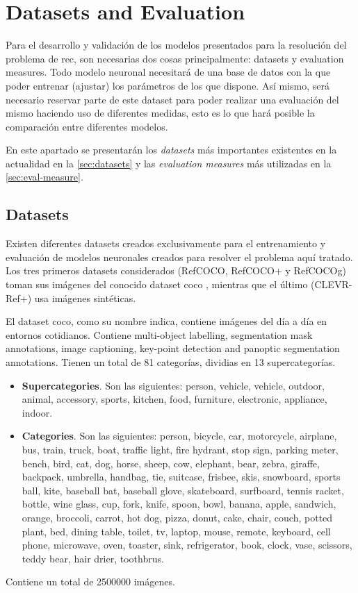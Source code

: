 \section{Datasets and Evaluation} \label{sec:data-eval}

Para el desarrollo y validación de los modelos presentados para la resolución
del problema de \gls{rec}, son necesarias dos cosas principalmente: datasets y
evaluation measures. Todo modelo neuronal necesitará de una base de datos con
la que poder entrenar (ajustar) los parámetros de los que dispone. Así mismo,
será necesario reservar parte de este dataset para poder realizar una
evaluación del mismo haciendo uso de diferentes medidas, esto es lo que hará
posible la comparación entre diferentes modelos.

En este apartado se presentarán los \emph{datasets} más importantes existentes en la
actualidad en la \vref{sec:datasets} y las \emph{evaluation measures}
más utilizadas en la \vref{sec:eval-measure}.

\subsection{Datasets} \label{sec:datasets}

Existen diferentes datasets creados exclusivamente para el entrenamiento y
evaluación de modelos neuronales creados para resolver el problema aquí
tratado. Los tres primeros datasets considerados (RefCOCO, RefCOCO+ y RefCOCOg)
toman sus imágenes del conocido dataset \gls{coco}
\cite{lin14:micros}, mientras que el último
(CLEVR-Ref+) usa imágenes sintéticas.

El dataset \gls{coco}, como su nombre indica, contiene imágenes del día a día
en entornos cotidianos. Contiene multi-object labelling, segmentation mask
annotations, image captioning, key-point detection and panoptic segmentation
annotations. Tienen un total de 81 categorías, dividias en 13 supercategorías.
\begin{itemize}
  \item \textbf{Supercategories}. Son las siguientes: person, vehicle, vehicle,
  outdoor, animal, accessory, sports, kitchen, food, furniture, electronic,
  appliance, indoor.
  \item \textbf{Categories}. Son las siguientes: person, bicycle, car,
  motorcycle, airplane, bus, train, truck, boat, traffic light, fire hydrant,
  stop sign, parking meter, bench, bird, cat, dog, horse, sheep, cow, elephant,
  bear, zebra, giraffe, backpack, umbrella, handbag, tie, suitcase, frisbee,
  skis, snowboard, sports ball, kite, baseball bat, baseball glove, skateboard,
  surfboard, tennis racket, bottle, wine glass, cup, fork, knife, spoon, bowl,
  banana, apple, sandwich, orange, broccoli, carrot, hot dog, pizza, donut,
  cake, chair, couch, potted plant, bed, dining table, toilet, tv, laptop,
  mouse, remote, keyboard, cell phone, microwave, oven, toaster, sink,
  refrigerator, book, clock, vase, scissors, teddy bear, hair drier, toothbrus.
\end{itemize}
Contiene un total de \num{2500000} imágenes.

